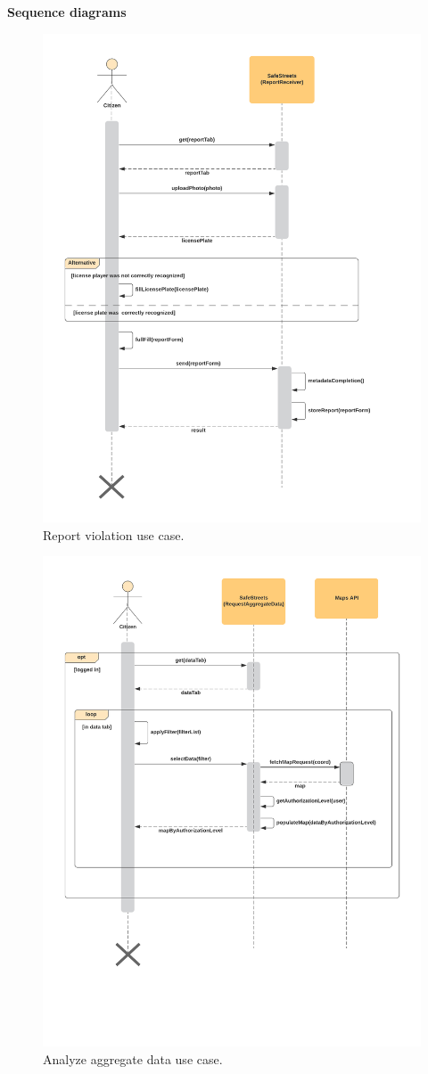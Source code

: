 \newpage
\textbf{Sequence diagrams}
\begin{figure}[H]
	\centering
	\includegraphics[width=\linewidth]{Images/UML/NotifyViolationUseCase}
	\caption{Report violation use case.}
\end{figure}
\begin{figure}[H]
	\centering
	\includegraphics[width=\linewidth]{Images/UML/AnalyzeDataUseCase}
	\caption{Analyze aggregate data use case.}
\end{figure}
